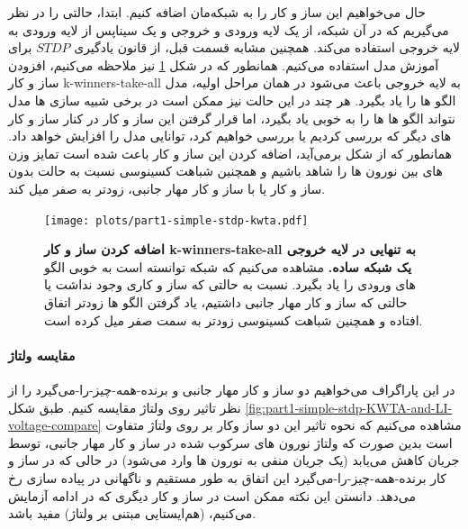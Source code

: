     حال می‌خواهیم این ساز و کار را به شبکه‌مان اضافه کنیم. ابتدا، حالتی را در نظر می‌گیریم که در آن شبکه، از یک لایه ورودی و خروجی و یک سیناپس از لایه ورودی به لایه خروجی استفاده می‌کند. همچنین مشابه قسمت قبل، از قانون یادگیری 
    $STDP$ 
    برای آموزش مدل استفاده می‌کنیم. همانطور که در شکل 
    \ref{fig:part1-simple-stdp-kwta}
    نیز ملاحظه می‌کنیم، افزودن ساز و کار 
    k-winners-take-all 
    به لایه خروجی باعث می‌شود در همان مراحل اولیه، مدل الگو ها را یاد بگیرد. هر چند در این حالت نیز ممکن است در برخی شبیه سازی ها مدل نتواند الگو ها ها را به خوبی یاد بگیرد، اما قرار گرفتن این ساز و کار  در کنار ساز و کار های دیگر که بررسی کردیم یا بررسی خواهیم کرد، توانایی مدل را افزایش خواهد داد. همانطور که از شکل برمی‌آید، اضافه کردن این ساز و کار باعث شده است تمایز وزن های بین نورون ها را شاهد باشیم و همچنین شباهت کسینوسی نسبت به حالت بدون ساز و کار یا با ساز و کار مهار جانبی، زودتر به صفر میل کند.

    \begin{figure}[!ht]
        \centering
        \texttt{[image: plots/part1-simple-stdp-kwta.pdf]} 
        \captionsetup{width=.85\linewidth}
        \caption{\textbf{اضافه کردن ساز و کار 
        k-winners-take-all
        به تنهایی در لایه خروجی یک شبکه ساده. } 
        مشاهده می‌کنیم که شبکه توانسته است به خوبی الگو های ورودی را یاد بگیرد. نسبت به حالتی که ساز و کاری وجود نداشت یا حالتی که ساز و کار مهار جانبی داشتیم، یاد گرفتن الگو ها زودتر اتفاق افتاده و همچنین شباهت کسینوسی زودتر به سمت صفر میل کرده است. 
        }
        \label{fig:part1-simple-stdp-kwta}
    \end{figure}

    \paragraph*{مقایسه ولتاژ} در این پاراگراف می‌خواهیم دو ساز و کار مهار جانبی و برنده-همه-چیز-را-می‌گیرد را از نظر تاثیر روی ولتاژ مقایسه کنیم. طبق شکل  
    \ref{fig:part1-simple-stdp-KWTA-and-LI-voltage-compare} 
    مشاهده می‌کنیم که نحوه تاثیر این دو ساز وکار بر روی ولتاژ متفاوت است بدین صورت که ولتاژ نورون های سرکوب شده در ساز و کار مهار جانبی، توسط جریان کاهش می‌یابد
    (یک جریان منفی به نورون ها وارد می‌شود) 
    در حالی که در ساز و کار برنده-همه-چیز-را-می‌گیرد این اتفاق به طور مستقیم و ناگهانی در پیاده سازی رخ می‌دهد. دانستن این نکته ممکن است در ساز و کار دیگری که در ادامه آزمایش می‌کنیم،
    (هم‌ایستایی مبتنی بر ولتاژ) 
    مفید باشد.
    
